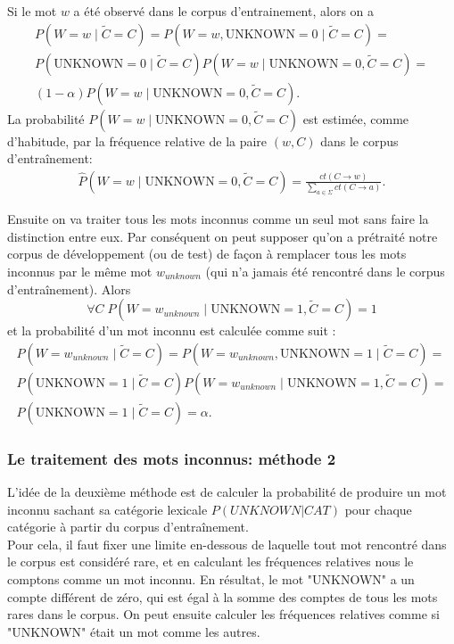 \documentclass[12pt]{article}
\begin{document}
 Si le mot $w$ a été observé dans le corpus d'entrainement, alors on a
\begin{multline}
\label{prob_mot_connu_1}
 P(W = w \mid \tilde{C} = C) = P(W = w, \mathrm{UNKNOWN} = 0 \mid \tilde{C} = C) = 
 \\
 P(\mathrm{UNKNOWN} = 0 \mid \tilde{C} = C) P(W = w \mid \mathrm{UNKNOWN} = 0, \tilde{C} = C) =
 \\
 (1 - \alpha) P(W = w \mid \mathrm{UNKNOWN} = 0, \tilde{C} = C).
\end{multline}
La probabilité $P(W = w \mid \mathrm{UNKNOWN} = 0, \tilde{C} = C)$ est estimée, 
comme d'habitude, par la fréquence relative de la paire $(w, C)$ dans le corpus
d'entraînement:
\begin{eqnarray*}
\hat{P}(W = w \mid \mathrm{UNKNOWN} = 0, \tilde{C} = C) =
\frac{ct(C \rightarrow w)}{\sum\limits_{a \in \Sigma}{ct(C \rightarrow a)}}.
\end{eqnarray*}

Ensuite on va traiter tous les mots inconnus comme un seul mot sans faire la
distinction entre eux.
Par conséquent on peut supposer qu'on a prétraité notre corpus de
développement (ou de test) de façon à remplacer tous les mots inconnus par le
même mot $w_{unknown}$ (qui n'a jamais été rencontré dans le corpus
d'entraînement). Alors $$\forall C \; P(W = w_{unknown} \mid \mathrm{UNKNOWN} =
1, \tilde{C} = C) = 1$$ et la probabilité d'un mot inconnu est calculée comme
suit :
\begin{multline}
\label{prob_mot_inconnu_1}
 P(W = w_{unknown} \mid \tilde{C} = C) = P(W = w_{unknown}, \mathrm{UNKNOWN} = 1 \mid \tilde{C} = C) =
 \\
 P(\mathrm{UNKNOWN} = 1 \mid \tilde{C} = C) P(W = w_{unknown} \mid \mathrm{UNKNOWN} = 1, \tilde{C} = C) =
 \\
 P(\mathrm{UNKNOWN} = 1 \mid \tilde{C} = C) = \alpha.
\end{multline}

\subsubsection{Le traitement des mots inconnus: m\'ethode 2}

L'idée de la deuxième méthode est de calculer la probabilité de
produire un mot inconnu sachant sa catégorie lexicale $P(UNKNOWN|CAT)$ pour
chaque catégorie à partir du corpus d'entraînement.\\

Pour cela, il faut fixer une limite en-dessous de laquelle tout mot rencontré dans le corpus est
considéré rare, et en calculant les fréquences relatives nous le comptons comme
un mot inconnu. En résultat, le mot "UNKNOWN" a un compte différent de zéro, qui
est égal à la somme des comptes de tous les mots rares dans le corpus. On peut
ensuite calculer les fréquences relatives comme si "UNKNOWN" était un mot comme
les autres. 
\\
\end{document}
